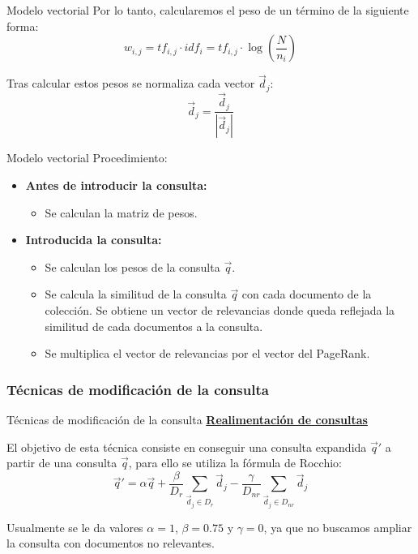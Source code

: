 \documentclass[ignorenonframetext,aspectratio=43,]{beamer}
\begin{document}
\begin{frame}{Modelo vectorial}
Por lo tanto, calcularemos el peso de un término de la siguiente forma:
$$w_{i,j} = tf_{i,j} \cdot idf_i = tf_{i,j} \cdot \log \left(\frac{N}{n_i} \right) $$


Tras calcular estos pesos se normaliza cada vector $\vec{d}_j$:
$$\vec{d}_j = \frac{\vec{d}_j}{|\vec{d}_j|} $$
\end{frame}

\begin{frame}{Modelo vectorial}
Procedimiento:
\begin{itemize}
\item \textbf{Antes de introducir la consulta:}
\begin{itemize}
\item Se calculan la matriz de pesos.
\end{itemize}
\item \textbf{Introducida la consulta:}
\begin{itemize}
\item Se calculan los pesos de la consulta $\vec{q}$.
\item Se calcula la similitud de la consulta $\vec{q}$ con cada documento de la colección. Se obtiene un vector de relevancias donde queda reflejada la similitud de cada documentos a la consulta.
\item Se multiplica el vector de relevancias por el vector del PageRank.
\end{itemize}
\end{itemize}

\end{frame}

\subsubsection{Técnicas de modificación de la consulta}
\begin{frame}{Técnicas de modificación de la consulta}
\underline{\textbf{Realimentación de consultas}}


El objetivo de esta técnica consiste en conseguir una consulta expandida $\vec{q}'$ a partir de una consulta $\vec{q}$, para ello se utiliza la fórmula de Rocchio:
$$\vec{q}' = \alpha \vec{q} + \frac{\beta}{D_r} \sum_{\vec{d}_j \in D_r} \vec{d}_j - \frac{\gamma}{D_{nr}} \sum_{\vec{d}_j \in D_{nr}} \vec{d}_j $$

 Usualmente se le da valores $\alpha = 1$, $\beta = 0.75$ y $\gamma = 0$, ya que no buscamos ampliar la consulta con documentos no relevantes.
\end{frame}
\end{document}
